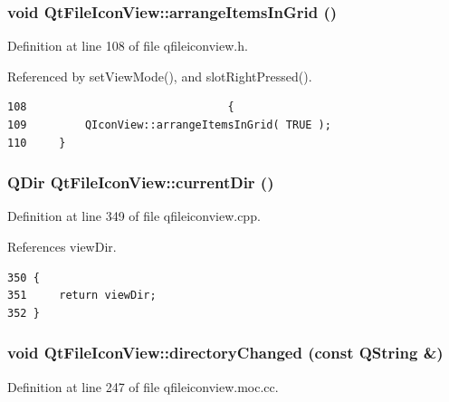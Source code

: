 \subsubsection{\setlength{\rightskip}{0pt plus 5cm}void Qt\-File\-Icon\-View::arrange\-Items\-In\-Grid ()\hspace{0.3cm}{\tt  [inline, protected, slot]}}\label{classQtFileIconView_QtFileIconViewj13}




Definition at line 108 of file qfileiconview.h.

Referenced by set\-View\-Mode(), and slot\-Right\-Pressed().



\footnotesize\begin{verbatim}108                               {
109         QIconView::arrangeItemsInGrid( TRUE );
110     }
\end{verbatim}\normalsize 
{}
\subsubsection{\setlength{\rightskip}{0pt plus 5cm}QDir Qt\-File\-Icon\-View::current\-Dir ()\hspace{0.3cm}{\tt  [slot]}}\label{classQtFileIconView_QtFileIconViewi3}




Definition at line 349 of file qfileiconview.cpp.

References view\-Dir.



\footnotesize\begin{verbatim}350 {
351     return viewDir;
352 }
\end{verbatim}\normalsize 
{}
\subsubsection{\setlength{\rightskip}{0pt plus 5cm}void Qt\-File\-Icon\-View::directory\-Changed (const QString \&)\hspace{0.3cm}{\tt  [signal]}}\label{classQtFileIconView_QtFileIconViewl0}




Definition at line 247 of file qfileiconview.moc.cc.

